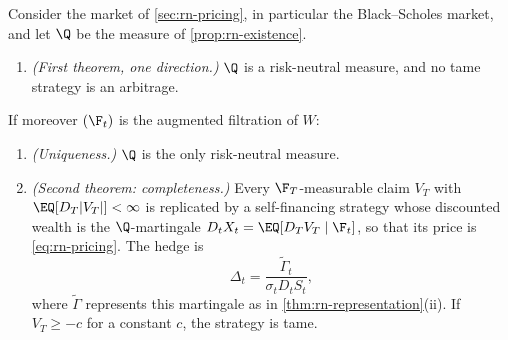 \begin{theorem}\label{thm:rn-ftap}
Consider the market of \cref{sec:rn-pricing}, in particular the Black--Scholes market, and
let $\Q$ be the measure of \cref{prop:rn-existence}.
\begin{enumerate}[label=(\roman*)]
  \item \emph{(First theorem, one direction.)} $\Q$ is a risk-neutral measure, and no tame
    strategy is an arbitrage.
\end{enumerate}
If moreover $(\F_t)$ is the augmented filtration of $W$:
\begin{enumerate}[label=(\roman*),resume]
  \item \emph{(Uniqueness.)} $\Q$ is the only risk-neutral measure.
  \item \emph{(Second theorem: completeness.)} Every $\F_T$-measurable claim $V_T$ with
    $\EQ[D_T|V_T|]<\infty$ is replicated by a self-financing strategy whose discounted wealth
    is the $\Q$-martingale $D_tX_t=\EQ[D_TV_T\mid\F_t]$, so that its price is
    \eqref{eq:rn-pricing}. The hedge is
    \begin{equation}\label{eq:rn-hedge}
      \Delta_t=\frac{\widetilde\Gamma_t}{\sigma_tD_tS_t},
    \end{equation}
    where $\widetilde\Gamma$ represents this martingale as in
    \cref{thm:rn-representation}(ii). If $V_T\ge-c$ for a constant $c$, the strategy is tame.
\end{enumerate}
\end{theorem}

